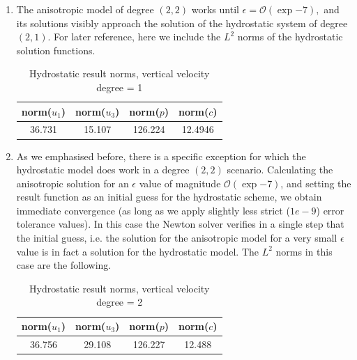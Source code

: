 \documentclass[12pt]{report}
\numberwithin{theorem}{chapter}
\numberwithin{corollary}{chapter}
\numberwithin{lemma}{chapter}
\numberwithin{remark}{chapter}
\numberwithin{definition}{chapter}
\numberwithin{prop}{chapter}
\begin{document}
\begin{enumerate}[label=\arabic*)]
  \item The anisotropic model of degree $(2,2)$ works until $\epsilon = \mathcal{O}(\exp{-7}),$ and its solutions visibly approach the solution of the hydrostatic system of degree $(2,1)$. For later reference, here we include the $L^2$ norms of the hydrostatic solution functions.
  
\begin{table}[H]
\caption{Hydrostatic result norms, vertical velocity degree = 1}
\begin{center}
\begin{tabular}{cccc}
    \hline
    norm($u_1$) & norm($u_3$) & norm($p$) & norm($c$) \\
    \hline
    36.731 & 15.107 & 126.224 & 12.4946 \\
    \hline
\end{tabular}
\end{center}
\end{table}
  
  \item As we emphasised before, there is a specific exception for which the hydrostatic model does work in a degree $(2,2)$ scenario. Calculating the anisotropic solution for an $\epsilon$ value of magnitude $\mathcal{O}(\exp{-7})$, and setting the result function as an initial guess for the hydrostatic scheme, we obtain immediate convergence (as long as we apply slightly less strict ($1e-9$) error tolerance values). In this case the Newton solver verifies in a single step that the initial guess, i.e. the solution for the anisotropic model for a very small $\epsilon$ value is in fact a solution for the hydrostatic model. The $L^2$ norms in this case are the following.
  
  \begin{table}[H]
\caption{Hydrostatic result norms, vertical velocity degree = 2}
\begin{center}
\begin{tabular}{cccc}
    \hline
    norm($u_1$) & norm($u_3$) & norm($p$) & norm($c$) \\
    \hline
     36.756 & 29.108 & 126.227 & 12.488 \\
    \hline
\end{tabular}
\end{center}
\end{table}
  
\end{enumerate}
\end{document}
